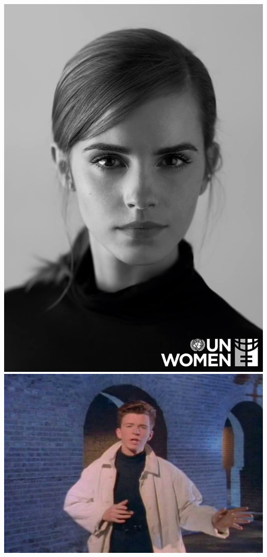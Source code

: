 \documentclass[12pt]{article}
\begin{document}
\includegraphics[scale=0.2]{picture}
\includegraphics[scale = 0.2]{img/picture2}
\newpage
\end{document}
